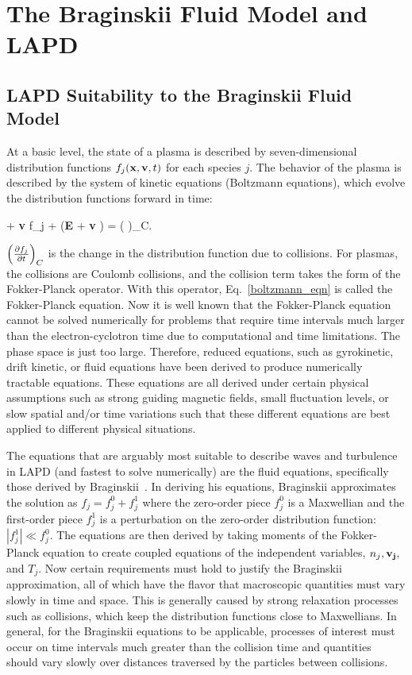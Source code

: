 \chapter{The Braginskii Fluid Model and LAPD}
\label{c_braginskii}

\section{LAPD Suitability to the Braginskii Fluid Model}
\label{s_lapd_suitability}

At a basic level, the state of a plasma is described by seven-dimensional distribution functions $f_j({\bf{x}},{\bf v},t)$ for each species $j$. The behavior of the plasma
is described by the system of kinetic equations (Boltzmann equations), which evolve the distribution functions forward in time:

\beq
\label{boltzmann_eqn}
 + {\bf v} \cdot \grad f_j +  ({\bf E} + {\bf v} ) \cdot {} = \left( \right)_C.
\eeq

$\left(\frac{\partial f_j}{\partial t} \right)_C$ is the change in the distribution function due to collisions. For plasmas, the collisions are Coulomb collisions, and the collision term takes the form of 
the Fokker-Planck operator. With this operator, Eq.~\ref{boltzmann_eqn} is called the Fokker-Planck equation. Now it is well known that the Fokker-Planck equation cannot be solved
numerically for problems that require time intervals much larger than the electron-cyclotron time due to computational and time limitations. The phase space is just too large. Therefore,
reduced equations, such as gyrokinetic, drift kinetic, or fluid equations have been derived to produce numerically tractable equations. 
These equations are all derived under certain physical assumptions such as strong guiding magnetic fields, small fluctuation levels, 
or slow spatial and/or time variations such that these different equations are best applied to different physical situations.

The equations that are arguably most suitable to describe waves and turbulence in LAPD (and fastest to solve numerically) are the fluid equations, 
specifically those derived by Braginskii~\cite{Braginskii1965}.
In deriving his equations, Braginskii approximates the solution as $f_j = f_j^0 + f_j^1$ where the zero-order piece $f_j^0$ is a Maxwellian and the first-order piece $f_j^1$ is a perturbation on the
zero-order distribution function: $|f_j^1| \ll f_j^0$. The equations are then derived by taking moments of the Fokker-Planck equation to create coupled equations of the independent variables,
$n_j, {\bf v_j},$ and $T_j$. Now certain requirements must hold to justify the Braginskii approximation, all of which have the flavor that macroscopic quantities must vary slowly in time and space.
This is generally caused by strong relaxation processes such as collisions, which keep the distribution functions close to Maxwellians. In general, for the Braginskii equations to be applicable,
processes of interest must occur on time intervals much greater than the collision time and quantities should vary slowly over distances traversed by the particles between collisions.

